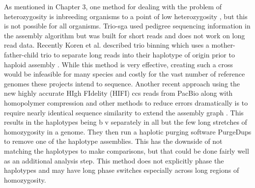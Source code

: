 \par{
As mentioned in Chapter 3, one method for dealing with the problem of heterozygosity is inbreeding organisms to a point of low heterozygosity \cite{drosophila}, 
but this is not possible for all organisms. Trio-sga used pedigree sequencing information in the assembly algorithm \cite{trio-sga} 
but was built for short reads and does not work on long read data. Recently Koren et al. described trio binning which uses a mother-father-child trio to 
separate long reads into their haplotype of origin prior to haploid assembly \cite{triobinning}. 
While this method is very effective, creating such a cross would be infeasible for many species and costly for the vast number of reference genomes these projects intend to sequence. 
Another recent approach using the new highly accurate HIgh FIdelity (HIFI) ccs reads from PacBio along with homopolymer compression and other methods to reduce errors dramatically is to 
require nearly identical sequence similarity to extend the assembly graph \cite{HICANU}. This results in the haplotypes being b v separately in all but the few long stretches of homozygosity in 
a genome. They then run a haplotic purging software PurgeDups \cite{purgedups} to remove one of the haplotype assemblies. This has the downside of not matching the haplotypes to make comparisons, but that could be done 
fairly well as an additional analysis step. This method does not explicitly phase the haplotypes and may have long phase switches especially across long regions of homozygosity.
} \\

